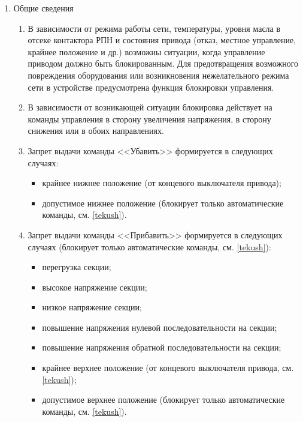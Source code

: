 
\color{black}

\begin{enumerate}


\item Общие сведения

\begin{enumerate}

\item В зависимости от режима работы сети, температуры, уровня масла в отсеке контактора РПН и состояния привода (отказ, местное управление, крайнее положение и др.) возможны ситуации, когда управление приводом должно быть блокированным. Для предотвращения возможного повреждения оборудования или возникновения нежелательного режима сети в устройстве предусмотрена функция блокировки управления. 
\item В зависимости от возникающей ситуации блокировка действует на команды управления в сторону увеличения напряжения, в сторону снижения или в обоих направлениях.

\item Запрет выдачи команды <<Убавить>> формируется в следующих случаях:
\begin{itemize}
    \item крайнее нижнее положение (от концевого выключателя привода);
    \item допустимое нижнее положение (блокирует только автоматические команды, см. \ref{tekush}).
\end{itemize}

\item Запрет выдачи команды <<Прибавить>> формируется в следующих случаях (блокирует только автоматические команды, см. \ref{tekush}):
\begin{itemize}
    \item перегрузка секции;
    \item высокое напряжение секции;
    \item низкое напряжение секции;
    \item повышение напряжения нулевой последовательности на секции;
    \item повышение напряжения обратной последовательности на секции;
    \item крайнее верхнее положение (от концевого выключателя привода, см. \ref{tekush});
    \item допустимое верхнее положение (блокирует только автоматические команды, см. \ref{tekush}).
\end{itemize}


\end{enumerate}
\end{enumerate}

